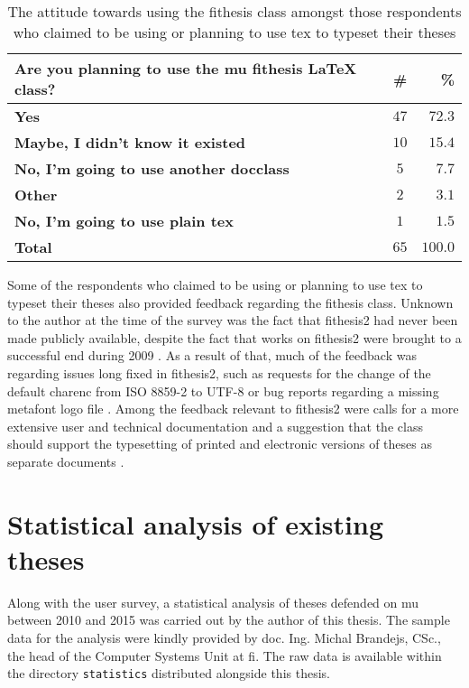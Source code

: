   \begin{table}
    \begin{tabularx}{\textwidth}{Xcr}
      \textbf{Are you planning to use the \gls{mu} fithesis \LaTeX{} class?} & \textbf{\#} & \textbf{\%} \\
      \hline
      \textbf{Yes}                                         & $47$          & $72.3$ \\
      \textbf{Maybe, I didn't know it existed}             & $10$          & $15.4$ \\
      \textbf{No, I'm going to use another \gls{docclass}} & $5$           &  $7.7$ \\
      \textbf{Other}                                       & $2$           &  $3.1$ \\
      \textbf{No, I'm going to use plain \gls{tex}}        & $1$           &  $1.5$ \\
      \hline
      \textbf{Total}                                       & \textbf{$65$} & \textbf{$100.0$}
    \end{tabularx}
    \caption{The attitude towards using the fithesis class amongst those respondents who claimed to be using or planning to use \gls{tex} to typeset their theses}
    \label{table:survey-tex}
  \end{table}

  Some of the respondents who claimed to be using or planning to use \gls{tex} to typeset their theses also provided feedback regarding the fithesis class. Unknown to the author at the time of the survey was the fact that fithesis2 had never been made publicly available, despite the fact that works on fithesis2 were brought to a successful end during 2009 \cite{Filipcik09}. As a result of that, much of the feedback was regarding issues long fixed in fithesis2, such as requests for the change of the default \gls{charenc} from ISO 8859-2 to UTF-8 \cite[section~4.1]{Filipcik09} or bug reports regarding a missing metafont logo file \cite{fithesis2@fbd7a25}. Among the feedback relevant to fithesis2 were calls for a more extensive user and technical documentation \pending{} and a suggestion that the class should support the typesetting of printed and electronic versions of theses as separate documents \pending{}.

  \section{Statistical analysis of existing theses}
  Along with the user survey, a statistical analysis of theses defended on \gls{mu} between 2010 and 2015 was carried out by the author of this thesis. The sample data for the analysis were kindly provided by doc. Ing. Michal Brandejs, CSc., the head of the Computer Systems Unit at \gls{fi}. The raw data is available within the directory \texttt{statistics} distributed alongside this thesis.

